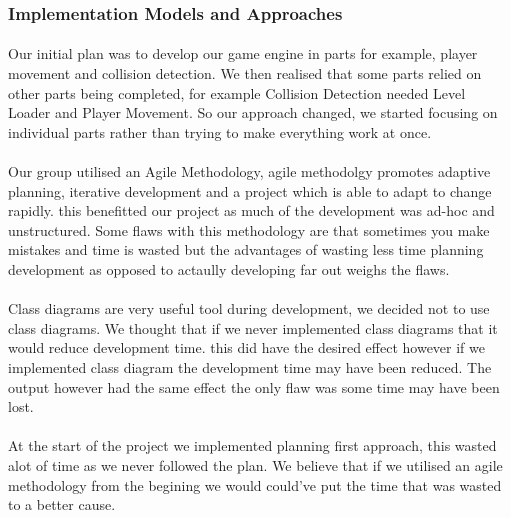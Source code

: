 \documentclass{article}
\begin{document}
\subsubsection{Implementation Models and Approaches}
\paragraph{}
Our initial plan was to develop our game engine in parts for example, player movement and collision detection. We then realised that some parts relied on other parts being completed, for example Collision Detection needed Level Loader and Player Movement. So our approach changed, we started focusing on individual parts rather than trying to make everything work at once. 
\paragraph{}
Our group utilised an Agile Methodology, agile methodolgy promotes adaptive planning, iterative development and a project which is able to adapt to change rapidly. this benefitted our project as much of the development was ad-hoc and unstructured. Some flaws with this methodology are that sometimes you make mistakes and time is wasted but the advantages of wasting less time planning development as opposed to actaully developing far out weighs the flaws. 
\paragraph{}
Class diagrams are very useful tool during development, we decided not to use class diagrams. We thought that if we never implemented class diagrams that it would reduce development time. this did have the desired effect however if we implemented class diagram the development time may have been reduced. The  output however had the same effect the only flaw was some time may have been lost. 
\paragraph{}
At the start of the project we implemented planning first approach, this wasted alot of time as we never followed the plan. We believe that if we utilised an agile methodology from the begining we would could've put the time that was wasted to a better cause.


 
\end{document}
